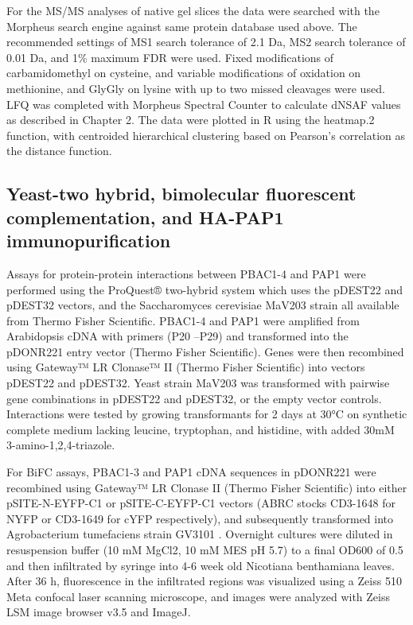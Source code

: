 	For the MS/MS analyses of native gel slices the data were searched with the Morpheus search engine \citep{wenger13} against same protein database used above. The recommended settings of MS1 search tolerance of 2.1 Da, MS2 search tolerance of 0.01 Da, and 1\% maximum FDR were used.  Fixed modifications of carbamidomethyl on cysteine, and variable modifications of oxidation on methionine, and GlyGly on lysine with up to two missed cleavages were used. LFQ was completed with Morpheus Spectral Counter \citep{gemperline16} to calculate dNSAF values as described in Chapter 2. The data were plotted in R using the heatmap.2 function, with centroided hierarchical clustering based on Pearson’s correlation as the distance function.

\subsection{Yeast-two hybrid, bimolecular fluorescent complementation, and HA-PAP1 immunopurification}
	Assays for protein-protein interactions between PBAC1-4 and PAP1 were performed using the ProQuest® two-hybrid system which uses the pDEST22 and pDEST32 vectors, and the Saccharomyces cerevisiae MaV203 strain  all available from Thermo Fisher Scientific. PBAC1-4 and PAP1 were amplified from Arabidopsis cDNA with primers (P20 –P29) and transformed into the pDONR221 entry vector (Thermo Fisher Scientific). Genes were then recombined using Gateway™ LR Clonase™ II (Thermo Fisher Scientific) into vectors pDEST22 and pDEST32. Yeast strain MaV203 was transformed with pairwise gene combinations in pDEST22 and pDEST32, or the empty vector controls. Interactions were tested by growing transformants for 2 days at 30°C on synthetic complete medium lacking leucine, tryptophan, and histidine, with added 30mM 3-amino-1,2,4-triazole.

	For BiFC assays, PBAC1-3 and PAP1 cDNA sequences in pDONR221 were recombined using Gateway™  LR Clonase II (Thermo Fisher Scientific) into either pSITE-N-EYFP-C1 or pSITE-C-EYFP-C1 vectors  (ABRC stocks CD3-1648 for NYFP or CD3-1649 for cYFP respectively), and subsequently transformed into Agrobacterium tumefaciens strain GV3101 \citep{gelvin03}. Overnight cultures were diluted in resuspension buffer (10 mM MgCl2, 10 mM MES pH 5.7) to a final OD600 of 0.5 and then infiltrated by syringe into 4-6 week old Nicotiana benthamiana leaves. After 36 h, fluorescence in the infiltrated regions was visualized using a Zeiss 510 Meta confocal laser scanning microscope, and images were analyzed with Zeiss LSM image browser v3.5 and ImageJ.
	
